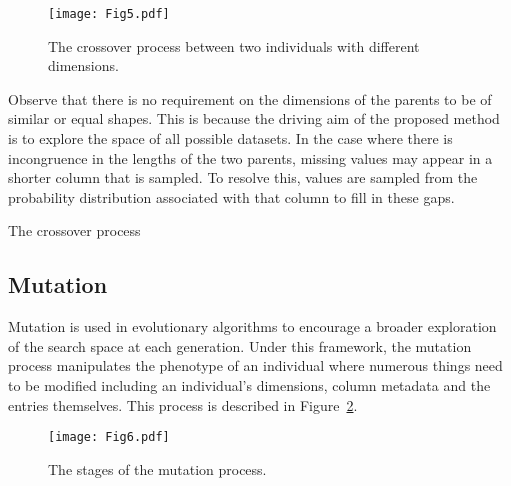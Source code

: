 \documentclass[11pt]{article}
\newcommand{\balg}[1][htbp]{%
    \begin{algorithm}[#1]\DontPrintSemicolon
}
\newcommand{\ealg}{%
    \end{algorithm}
}
\begin{document}
\begin{figure}[htbp]
    \centering
    \texttt{[image: Fig5.pdf]}
    \caption{%
        The crossover process between two individuals with different dimensions.
    }\label{fig:crossover}
\end{figure}

Observe that there is no requirement on the dimensions of the parents to be of
similar or equal shapes. This is because the driving aim of the proposed method
is to explore the space of all possible datasets. In the case where there is
incongruence in the lengths of the two parents, missing values may appear in a
shorter column that is sampled. To resolve this, values are sampled from the
probability distribution associated with that column to fill in these gaps.

\balg%

\caption{The crossover process}
\ealg%

\subsection{Mutation}\label{subsection:mutation}

Mutation is used in evolutionary algorithms to encourage a broader exploration
of the search space at each generation. Under this framework, the mutation
process manipulates the phenotype of an individual where numerous things need to
be modified including an individual's dimensions, column metadata and the
entries themselves. This process is described in Figure~\ref{fig:mutation}.

\begin{figure}[htbp]
    \centering
    \texttt{[image: Fig6.pdf]}
    \caption{%
        The stages of the mutation process.
    }\label{fig:mutation}
\end{figure}
\end{document}
